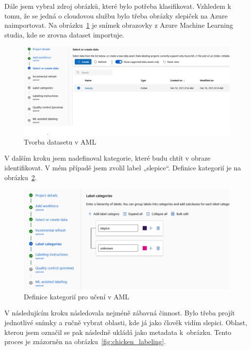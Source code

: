 Dále jsem vybral zdroj obrázků, které bylo potřeba klasifikovat.
Vzhledem k tomu, že se jedná o cloudovou službu bylo třeba obrázky slepiček na Azure naimportovat.
Na obrázku~\ref{fig:dataset_selection} je snímek obrazovky z Azure Machine Learning studia, kde se zrovna dataset importuje.

\begin{figure}[htbp]
    \centering
    \includegraphics[width=1.0\textwidth]{img/dataset_selection}
    \caption{Tvorba datasetu v AML}
    \label{fig:dataset_selection}
\end{figure}

V dalším kroku jsem nadefinoval kategorie, které budu chtít v obraze identifikovat.
V mém případě jsem zvolil label „slepice“.
Definice kategorií je na obrázku~\ref{fig:category_definition}.

\begin{figure}[htbp]
    \centering
    \includegraphics[width=1.0\textwidth]{img/category_definition}
    \caption{Definice kategorií pro učení v AML}
    \label{fig:category_definition}
\end{figure}

V následujícím kroku následovala nejméně zábavná činnost.
Bylo třeba projít jednotlivé snímky a ručně vybrat oblasti, kde já jako člověk vidím slepici.
Oblast, kterou jsem označil se pak následně ukládá jako metadata k~obrázku.
Tento proces je znázorněn na obrázku~\ref{fig:chicken_labeling}.

